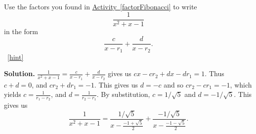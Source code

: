 \documentclass{book}
\begin{document}
\setcounter{project}{268}
\addtocounter{project}{-1}
\begin{activity}[]\label{fractionFibonacci}
\hypertarget{p-1434}{}%
Use the factors you found in \hyperref[factorFibonacci]{Activity~\ref{factorFibonacci}} to write%
\begin{equation*}
\frac{1}{x^2+x-1}
\end{equation*}
in the form%
\begin{equation*}
\frac{c}{x-r_1} + \frac{d}{x-r_2}.
\end{equation*}
%
~\hfill{\tiny\hyperlink{a-268}{[hint]}\hypertarget{q-268}{}}\par\smallskip%
\noindent\textbf{Solution.}\hypertarget{solution-205}{}\quad%
\hypertarget{p-1436}{}%
\(\frac{1}{x^2+x-1}=\frac{c}{x-r_1}+\frac{d}{x-r_2}\) gives us \(cx-cr_2+dx-dr_1=1\). Thus \(c+d=0\), and \(cr_2+dr_1 =-1\). This gives us \(d=-c\) and so \(cr_2-cr_1=-1\), which yields \(c=\frac{1}{r_1-r_2}\), and \(d=\frac{1}{r_2-r_1}\). By substitution, \(c=1/\sqrt{5}\) and \(d=-1/\sqrt{5}\). This gives us%
\begin{equation*}
\frac{1}{x^2+x-1} = \frac{1/\sqrt{5}}{x-\frac{-1+\sqrt{5}}{2}}
+ \frac{-1/\sqrt{5}}{x- \frac{-1-\sqrt{5}}{2}}\text{.}
\end{equation*}
%
\end{activity}
\end{document}

